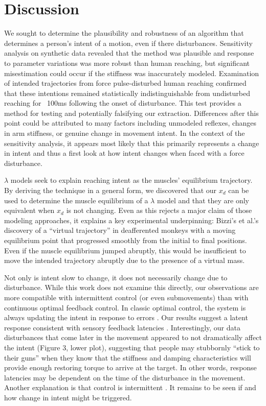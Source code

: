 \documentclass[10pt]{article}
\begin{document}
\section*{Discussion}
We sought to determine the plausibility and robustness of an algorithm that determines a person’s intent of a motion, even if there disturbances. Sensitivity analysis on synthetic data revealed that the method was plausible and response to parameter variations was more robust than human reaching, but significant misestimation could occur if the stiffness was inaccurately modeled. Examination of intended trajectories from force pulse-disturbed human reaching confirmed that these intentions remained statistically indistinguishable from undisturbed reaching for ~100ms following the onset of disturbance. This test provides a method for testing and potentially falsifying our extraction. Differences after this point could be attributed to many factors including unmodeled reflexes, changes in arm stiffness, or genuine change in movement intent. In the context of the sensitivity analysis, it appears most likely that this primarily represents a change in intent and thus a first look at how intent changes when faced with a force disturbance.

$\lambda$ models seek to explain reaching intent as the muscles’ equilibrium trajectory. By deriving the technique in a general form, we discovered that our $x_d$ can be used to determine the muscle equilibrium of a $\lambda$ model and that they are only equivalent when $x_d$ is not changing. Even as this rejects a major claim of those modeling approaches, it explains a key experimental underpinning: Bizzi’s et al.’s \cite{bizzi1984posture} discovery of a “virtual trajectory” in deafferented monkeys with a moving equilibrium point that progressed smoothly from the initial to final positions. Even if the muscle equilibrium jumped abruptly, this would be insufficient to move the intended trajectory abruptly due to the presence of a virtual mass.

Not only is intent slow to change, it does not necessarily change due to disturbance. While this work does not examine this directly, our observations are more compatible with intermittent control (or even submovements) than with continuous optimal feedback control. In classic optimal control, the system is always updating the intent in response to errors \cite{todorov2002optimal}. Our results suggest a latent response consistent with sensory feedback latencies \cite{pruszynski2012optimal}. Interestingly, our data disturbances that come later in the movement appeared to not dramatically affect the intent (Figure 3, lower plot), suggesting that people may stubbornly “stick to their guns” when they know that the stiffness and damping characteristics will provide enough restoring torque to arrive at the target. In other words, response latencies may be  dependent on the time of the disturbance in the movement. Another explanation is that control is intermittent \cite{gawthrop2011intermittent}. It remains to be seen if and how change in intent might be triggered. 
\end{document}
